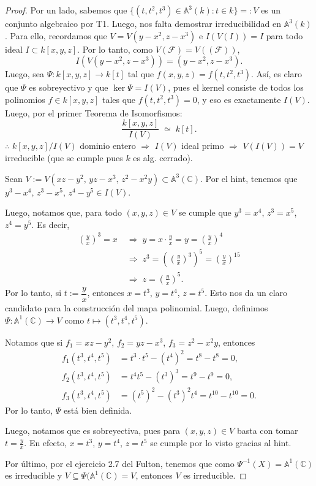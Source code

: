 \documentclass[12pt,a4paper]{article}
\theoremstyle{plain}
\newcommand{\A}{\mathbb{A}}
\newcommand{\C}{\mathbb{C}}
\begin{document}
\begin{proof}
	 Por un lado, sabemos que $\{(t,t^2,t^3)\in\A^3(k): t\in k\}=:V$ es un conjunto algebraico por T1. Luego, nos falta demostrar irreducibilidad en $\A^3(k)$. Para ello, recordamos que $V=V(y-x^2,z-x^3)$ e $I(V(I))= I$ para todo ideal $I \subset k[x,y,z]$. Por lo tanto, como $V(\mathcal{F})=V((\mathcal{F}))$,
	\[
	  I(V(y-x^2,z-x^3))=(y-x^2, z-x^3).
	\]
	Luego, sea $\Psi \colon k[x,y,z] \to k[t]$ tal que $f(x,y,z)=f(t,t^2,t^3)$. Así, es claro que $\Psi$ es sobreyectivo y que $\ker\Psi=I(V)$, pues el kernel consiste de todos los polinomios $f\in k[x,y,z]$ tales que $f(t,t^2,t^3)=0$, y eso es exactamente $I(V)$. Luego, por el primer Teorema de Isomorfismos:
	\[
	  \frac{k[x,y,z]}{I(V)}\;\simeq\; k[t].
	\]
	$\therefore$ $k[x,y,z]/I(V)$ dominio entero $\Rightarrow$ $I(V)$ ideal primo $\Rightarrow$ $V(I(V))=V$ irreducible (que se cumple pues $k$ es alg. cerrado).

	\bigskip
	 Sean $V:=V(xz-y^2,\,yz-x^3,\,z^2-x^2y)\subset\A^3(\C)$. Por el hint, tenemos que $y^3-x^4,\, z^3-x^5,\, z^4-y^5\in I(V)$.

	Luego, notamos que, para todo $(x,y,z)\in V$ se cumple que $y^3=x^4$, $z^3=x^5$, $z^4=y^5$. Es decir,
	\begin{align*}
		\left(\frac{y}{x}\right)^3 = x \; &\Rightarrow\; y = x\cdot\frac{y}{x} = y = \left(\frac{y}{x}\right)^4 \\
		&\Rightarrow\; z^3 = \left(\left(\frac{y}{x}\right)^3\right)^5 = \left(\frac{y}{x}\right)^{15} \\
		&\Rightarrow\; z = \left(\frac{y}{x}\right)^5.
	\end{align*}
	Por lo tanto, si $t:=\dfrac{y}{x}$, entonces $x=t^3$, $y=t^4$, $z=t^5$. Esto nos da un claro candidato para la construcción del mapa polinomial. Luego, definimos $\Psi:\A^1(\C)\to V$ como $t\mapsto(t^3,t^4,t^5)$. \par

	Notamos que si $f_1=xz-y^2$, $f_2=yz-x^3$, $f_3=z^2-x^2y$, entonces
	\begin{align*}
	  f_1(t^3,t^4,t^5) &= t^3\cdot t^5-(t^4)^2 = t^8-t^8=0,\\
	  f_2(t^3,t^4,t^5) &= t^4 t^5-(t^3)^3 = t^9-t^9=0,\\
	  f_3(t^3,t^4,t^5) &= (t^5)^2-(t^3)^2 t^4 = t^{10}-t^{10}=0.
	\end{align*}
	Por lo tanto, $\Psi$ está bien definida.

	Luego, notamos que es sobreyectiva, pues para $(x,y,z)\in V$ basta con tomar $t=\tfrac{y}{x}$. En efecto, $x=t^3$, $y=t^4$, $z=t^5$ se cumple por lo visto gracias al hint.

	Por último, por el ejercicio 2.7 del Fulton, tenemos que como $\Psi^{-1}(X) = \A^{1}(\C)$ es irreducible y $V \subseteq \Psi(\A^{1}(\C) = V$, entonces $V$ es irreducible.
\end{proof}
\end{document}

